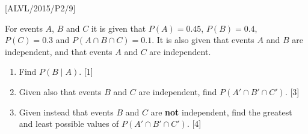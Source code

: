 \item {[}ALVL/2015/P2/9{]}

For events $A$, $B$ and $C$ it is given that $P\left(A\right)=0.45$,
$P\left(B\right)=0.4$, $P\left(C\right)=0.3$ and $P\left(A\cap B\cap C\right)=0.1$.
It is also given that events $A$ and $B$ are independent, and that
events $A$ and $C$ are independent.
\begin{enumerate}
\item Find $P\left(B\mid A\right)$. \hfill{}{[}1{]}
\item Given also that events $B$ and $C$ are independent, find $P\left(A'\cap B'\cap C'\right)$.
\hfill{}{[}3{]}
\item Given instead that events $B$ and $C$ are \textbf{not} independent,
find the greatest and least possible values of $P\left(A'\cap B'\cap C'\right)$.
\hfill{}{[}4{]}
\end{enumerate}
